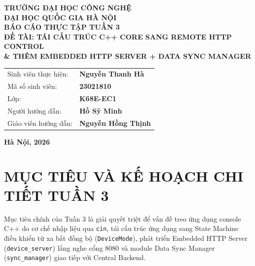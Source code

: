 \documentclass[12pt,a4paper]{article}
\begin{document}
\begin{titlepage}

\begin{center}
    \textbf{\fontsize{14}{17}\selectfont TRƯỜNG ĐẠI HỌC CÔNG NGHỆ} \\
    \textbf{\fontsize{12}{15}\selectfont ĐẠI HỌC QUỐC GIA HÀ NỘI} \\
    
    \vspace{2.5cm}
    \textbf{\fontsize{18}{22}\selectfont BÁO CÁO THỰC TẬP TUẦN 3} \\[0.5cm]
    \textbf{\fontsize{13}{16}\selectfont ĐỀ TÀI: TÁI CẤU TRÚC C++ CORE SANG REMOTE HTTP CONTROL} \\
    \textbf{\fontsize{13}{16}\selectfont \& THÊM EMBEDDED HTTP SERVER + DATA SYNC MANAGER} \\
    
    \vspace{3.5cm}
    \fontsize{12}{15}\selectfont
    \begin{tabular}{ll}
        Sinh viên thực hiện: & \textbf{Nguyễn Thanh Hà} \\
        Mã số sinh viên: & \textbf{23021810} \\
        Lớp: & \textbf{K68E-EC1} \\
        Người hướng dẫn: & \textbf{Hồ Sỹ Minh} \\
        Giáo viên hướng dẫn: & \textbf{Nguyễn Hồng Thịnh} \\
    \end{tabular}
    
    \vfill
    \textbf{Hà Nội, 2026}
\end{center}
\end{titlepage}

\newpage
\tableofcontents
\newpage

\section{MỤC TIÊU VÀ KẾ HOẠCH CHI TIẾT TUẦN 3}
Mục tiêu chính của Tuần 3 là giải quyết triệt để vấn đề treo ứng dụng console C++ do cơ chế nhập liệu qua \texttt{cin}, tái cấu trúc ứng dụng sang State Machine điều khiển từ xa bất đồng bộ (\texttt{DeviceMode}), phát triển Embedded HTTP Server (\texttt{device\_server}) lắng nghe cổng 8080 và module Data Sync Manager (\texttt{sync\_manager}) giao tiếp với Central Backend.
\end{document}

